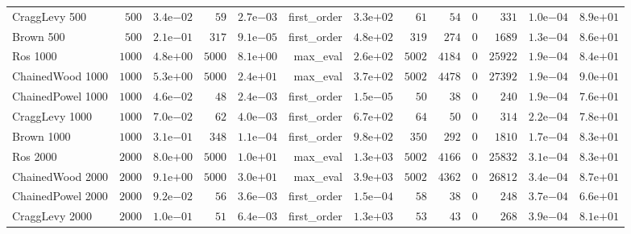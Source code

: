 \begin{longtable}[c]{lrrrrrrrrrrrr}
CraggLevy 500 & \(  500\) & \( 3.4\)e\(-02\) & \(   59\) & \( 2.7\)e\(-03\) & first\_order & \( 3.3\)e\(+02\) & \(   61\) & \(   54\) & \(    0\) & \(  331\) & \( 1.0\)e\(-04\) & \( 8.9\)e\(+01\) \\
Brown 500 & \(  500\) & \( 2.1\)e\(-01\) & \(  317\) & \( 9.1\)e\(-05\) & first\_order & \( 4.8\)e\(+02\) & \(  319\) & \(  274\) & \(    0\) & \( 1689\) & \( 1.3\)e\(-04\) & \( 8.6\)e\(+01\) \\
Ros 1000 & \( 1000\) & \( 4.8\)e\(+00\) & \( 5000\) & \( 8.1\)e\(+00\) & max\_eval & \( 2.6\)e\(+02\) & \( 5002\) & \( 4184\) & \(    0\) & \(25922\) & \( 1.9\)e\(-04\) & \( 8.4\)e\(+01\) \\
ChainedWood 1000 & \( 1000\) & \( 5.3\)e\(+00\) & \( 5000\) & \( 2.4\)e\(+01\) & max\_eval & \( 3.7\)e\(+02\) & \( 5002\) & \( 4478\) & \(    0\) & \(27392\) & \( 1.9\)e\(-04\) & \( 9.0\)e\(+01\) \\
ChainedPowel 1000 & \( 1000\) & \( 4.6\)e\(-02\) & \(   48\) & \( 2.4\)e\(-03\) & first\_order & \( 1.5\)e\(-05\) & \(   50\) & \(   38\) & \(    0\) & \(  240\) & \( 1.9\)e\(-04\) & \( 7.6\)e\(+01\) \\
CraggLevy 1000 & \( 1000\) & \( 7.0\)e\(-02\) & \(   62\) & \( 4.0\)e\(-03\) & first\_order & \( 6.7\)e\(+02\) & \(   64\) & \(   50\) & \(    0\) & \(  314\) & \( 2.2\)e\(-04\) & \( 7.8\)e\(+01\) \\
Brown 1000 & \( 1000\) & \( 3.1\)e\(-01\) & \(  348\) & \( 1.1\)e\(-04\) & first\_order & \( 9.8\)e\(+02\) & \(  350\) & \(  292\) & \(    0\) & \( 1810\) & \( 1.7\)e\(-04\) & \( 8.3\)e\(+01\) \\
Ros 2000 & \( 2000\) & \( 8.0\)e\(+00\) & \( 5000\) & \( 1.0\)e\(+01\) & max\_eval & \( 1.3\)e\(+03\) & \( 5002\) & \( 4166\) & \(    0\) & \(25832\) & \( 3.1\)e\(-04\) & \( 8.3\)e\(+01\) \\
ChainedWood 2000 & \( 2000\) & \( 9.1\)e\(+00\) & \( 5000\) & \( 3.0\)e\(+01\) & max\_eval & \( 3.9\)e\(+03\) & \( 5002\) & \( 4362\) & \(    0\) & \(26812\) & \( 3.4\)e\(-04\) & \( 8.7\)e\(+01\) \\
ChainedPowel 2000 & \( 2000\) & \( 9.2\)e\(-02\) & \(   56\) & \( 3.6\)e\(-03\) & first\_order & \( 1.5\)e\(-04\) & \(   58\) & \(   38\) & \(    0\) & \(  248\) & \( 3.7\)e\(-04\) & \( 6.6\)e\(+01\) \\
CraggLevy 2000 & \( 2000\) & \( 1.0\)e\(-01\) & \(   51\) & \( 6.4\)e\(-03\) & first\_order & \( 1.3\)e\(+03\) & \(   53\) & \(   43\) & \(    0\) & \(  268\) & \( 3.9\)e\(-04\) & \( 8.1\)e\(+01\) \\

\end{longtable}

